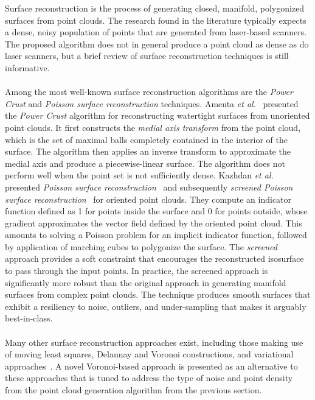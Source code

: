 Surface reconstruction is the process of generating closed, manifold, polygonized surfaces from point clouds. The research found in the literature typically expects a dense, noisy population of points that are generated from laser-based scanners. The proposed algorithm does not in general produce a point cloud as dense as do laser scanners, but a brief review of surface reconstruction techniques is still informative. \\ \\
%
Among the most well-known surface reconstruction algorithms are the \textit{Power Crust} and \textit{Poisson surface reconstruction} techniques. Amenta \textit{et al.}~\cite{amenta_2001} presented the \textit{Power Crust} algorithm for reconstructing watertight surfaces from unoriented point clouds. It first constructs the \textit{medial axis transform} from the point cloud, which is the set of maximal balls completely contained in the interior of the surface. The algorithm then applies an inverse transform to approximate the medial axis and produce a piecewise-linear surface. The algorithm does not perform well when the point set is not sufficiently dense. Kazhdan \textit{et al.} presented \textit{Poisson surface reconstruction}~\cite{kazhdan_2008} and subsequently \textit{screened Poisson surface reconstruction}~\cite{kazhdan_2013} for oriented point clouds. They compute an indicator function defined as 1 for points inside the surface and 0 for points outside, whose gradient approximates the vector field defined by the oriented point cloud. This amounts to solving a Poisson problem for an implicit indicator function, followed by application of marching cubes to polygonize the surface. The \textit{screened} approach provides a soft constraint that encourages the reconstructed isosurface to pass through the input points. In practice, the screened approach is significantly more robust than the original approach in generating manifold surfaces from complex point clouds. The technique produces smooth surfaces that exhibit a resiliency to noise, outliers, and under-sampling that makes it arguably best-in-class. \\ \\
%
Many other surface reconstruction approaches exist, including those making use of moving least squares, Delaunay and Voronoi constructions, and variational approaches~\cite{berger}. A novel Voronoi-based approach is presented as an alternative to these approaches that is tuned to address the type of noise and point density from the point cloud generation algorithm from the previous section. \\ \\
